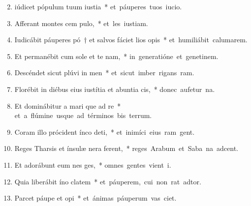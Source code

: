 \begin{flushleft}
\begin{enumerate}[leftmargin=*]
\setcounter{enumi}{1}

\item iúdicet pópulum tuum  iustia~* \mbox{et páuperes tuos  iucio.}

\item Afferant montes cem pulo,~* \mbox{et les iustiam.}

\item Iudicábit páuperes pó~† et salvos fáciet lios opis~* \mbox{et humiliábit calumarem.}

\item Et permanébit cum sole et te nam,~* \mbox{in generatióne et genetinem.}

\item Descéndet sicut plúvi in men~* \mbox{et sicut imber rigans ram.}

\item Florébit in diébus eius iustítia et abuntia cis,~* \mbox{donec aufetur na.}

\item Et dominábitur a mari que ad re~* \mbox{et a flúmine usque ad términos bis terrum.}

\item Coram illo prócident ínco deti,~* \mbox{et inimíci eius ram gent.}

\item Reges Tharsis et ínsulæ nera ferent,~* \mbox{reges Arabum et Saba na adcent.}

\item Et adorábunt eum nes ges,~* \mbox{omnes gentes vient i.}

\item Quia liberábit íno clatem~* \mbox{et páuperem, cui non rat adtor.}

\item Parcet páupe et opi~* \mbox{et ánimas páuperum vas ciet.}


\end{enumerate}
\end{flushleft}
